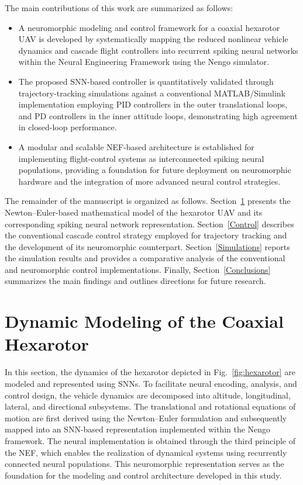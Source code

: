 \documentclass[conference]{IEEEtran}
\begin{document}
The main contributions of this work are summarized as follows:
\begin{itemize}
    \item A neuromorphic modeling and control framework for a coaxial hexarotor UAV is developed by systematically mapping the reduced nonlinear vehicle dynamics and cascade flight controllers into recurrent spiking neural networks within the Neural Engineering Framework using the Nengo simulator.
    \item The proposed SNN-based controller is quantitatively validated through trajectory-tracking simulations against a conventional MATLAB/Simulink implementation employing PID controllers in the outer translational loops, and PD controllers in the inner attitude loops, demonstrating high agreement in closed-loop performance.
    \item A modular and scalable NEF-based architecture is established for implementing flight-control systems as interconnected spiking neural populations, providing a foundation for future deployment on neuromorphic hardware and the integration of more advanced neural control strategies.
\end{itemize}

The remainder of the manuscript is organized as follows.
Section~\ref{Modeling} presents the Newton--Euler-based mathematical
model of the hexarotor UAV and its corresponding spiking neural
network representation. Section~\ref{Control} describes the
conventional cascade control strategy employed for trajectory tracking
and the development of its neuromorphic counterpart.
Section~\ref{Simulations} reports the simulation results and provides a
comparative analysis of the conventional and neuromorphic control
implementations. Finally, Section~\ref{Conclusions} summarizes the main
findings and outlines directions for future research.

\section{Dynamic Modeling of the Coaxial Hexarotor}\label{Modeling}

In this section, the dynamics of the hexarotor depicted in Fig.~\ref{fig:hexarotor} are modeled and represented using SNNs. To facilitate neural encoding, analysis, and control design, the vehicle dynamics are decomposed into altitude, longitudinal, lateral, and directional subsystems. The translational and rotational equations of motion are first derived using the Newton–Euler formulation and subsequently mapped into an SNN-based representation implemented within the Nengo framework. The neural implementation is obtained through the third principle of the NEF, which enables the realization of dynamical systems using recurrently connected neural populations. This neuromorphic representation serves as the foundation for the modeling and control architecture developed in this study.
\end{document}
